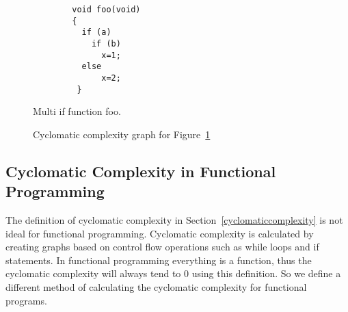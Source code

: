 \begin{figure}[H]
    \begin{lstlisting}
        void foo(void)
        {
          if (a)
            if (b) 
              x=1;
          else
              x=2;
         }
    \end{lstlisting}
    \caption{Multi if function foo.}
    \label{c1excode}
\end{figure}


\begin{figure}[H]
    \centering
    \caption{Cyclomatic complexity graph for Figure~\ref{c1excode}}
    \label{fig:c1exgraph}
\end{figure}

\subsection{Cyclomatic Complexity in Functional
Programming}

The definition of cyclomatic complexity in Section~\ref{cyclomaticcomplexity} is
not ideal for functional programming. Cyclomatic complexity is calculated by
creating graphs based on control flow operations such as while loops and if
statements. In functional programming everything is a function, thus the
cyclomatic complexity will always tend to 0 using this definition. So we define
a different method of calculating the cyclomatic complexity for functional
programs. 

